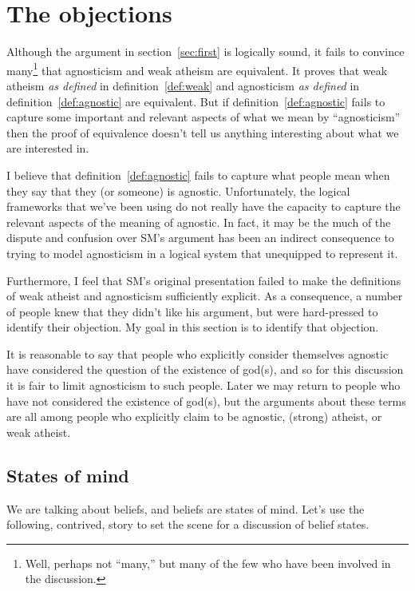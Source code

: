 \documentclass[12pt]{article}
\begin{document}
\section{The objections}\label{sec:object}

Although the argument in section~\ref{sec:first} is logically sound, it fails to convince many\footnote{Well, perhaps not “many,” but many of the few who have been involved in the discussion.}
that agnosticism and weak atheism are equivalent.
It proves that weak atheism \emph{as defined} in definition~\ref{def:weak}
and agnosticism \emph{as defined} in definition~\ref{def:agnostic} are equivalent.
But if definition~\ref{def:agnostic} fails to capture some important and relevant aspects of what we mean by “agnosticism” then the proof of equivalence doesn't tell us anything interesting about what we are interested in.

I believe that definition~\ref{def:agnostic} fails to capture what people mean when they say that they (or someone) is agnostic.
Unfortunately, the logical frameworks that we've been using do not really have the capacity to capture the relevant aspects of the meaning of agnostic.
In fact, it may be the much of the dispute and confusion over SM's argument has been an indirect consequence to trying to model agnosticism in a logical system that unequipped to represent it.

Furthermore, I feel that SM's original presentation failed to make the definitions of weak atheist and agnosticism sufficiently explicit.
As a consequence, a number of people knew that they didn't like his argument, but were hard-pressed to identify their objection.
My goal in this section is to identify that objection. 

It is reasonable to say that people who explicitly consider themselves agnostic have considered the question of the existence of god(s), and so for this discussion it is fair to limit agnosticism to such people.
Later we may return to people who have not considered the existence of god(s), but the arguments about these terms are all among people who explicitly claim to be agnostic, (strong) atheist, or weak atheist.

\subsection{States of mind}

We are talking about beliefs, and beliefs are states of mind.
Let's use the following, contrived, story to set the scene for a discussion of belief states.
\end{document}
